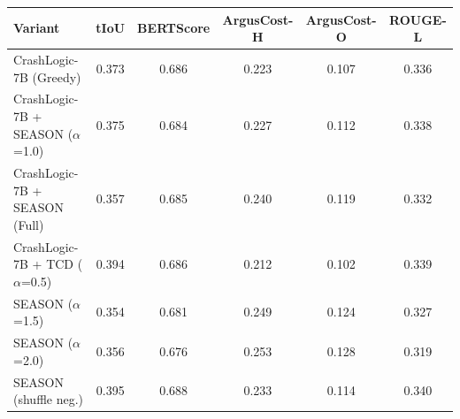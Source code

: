 \begin{tabular}{lccccc}
\toprule
Variant & tIoU & BERTScore & ArgusCost-H & ArgusCost-O & ROUGE-L \\
\midrule
CrashLogic-7B (Greedy) & 0.373 & 0.686 & 0.223 & 0.107 & 0.336 \\
CrashLogic-7B + SEASON ($\alpha$=1.0) & 0.375 & 0.684 & 0.227 & 0.112 & 0.338 \\
CrashLogic-7B + SEASON (Full) & 0.357 & 0.685 & 0.240 & 0.119 & 0.332 \\
CrashLogic-7B + TCD ($\alpha$=0.5) & 0.394 & 0.686 & 0.212 & 0.102 & 0.339 \\
SEASON ($\alpha$=1.5) & 0.354 & 0.681 & 0.249 & 0.124 & 0.327 \\
SEASON ($\alpha$=2.0) & 0.356 & 0.676 & 0.253 & 0.128 & 0.319 \\
SEASON (shuffle neg.) & 0.395 & 0.688 & 0.233 & 0.114 & 0.340 \\
\bottomrule
\end{tabular}
